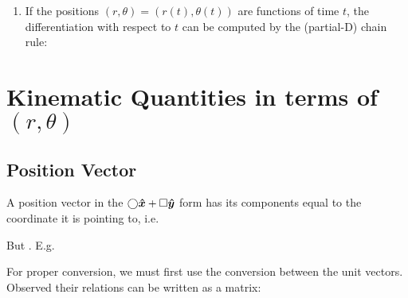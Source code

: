 \documentclass[class=article, crop=false, 12pt]{standalone}
\begin{document}
\begin{enumerate}
    \item If the positions $(r,\theta) = (r(t),\theta(t))$ are functions of time $t$,
    the differentiation with respect to $t$ can be computed by the (partial-D) chain rule:

\end{enumerate}





\linesep
\section{Kinematic Quantities in terms of $(r,\theta)$}

\subsection{Position Vector}


A position vector in the $\bigcirc\vu*{x} + \square\vu*{y}$ form has its components equal to the coordinate it is pointing to, i.e.

But . E.g. 

For proper conversion, we must first use the conversion between the unit vectors. 
Observed their relations can be written as a matrix:
\end{document}
